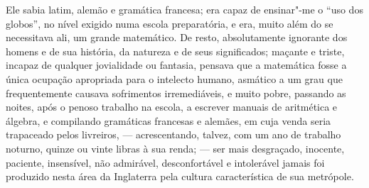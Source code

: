 Ele sabia latim, alemão e gramática francesa; era capaz de ensinar"-me o
``uso dos globos'', no nível exigido numa escola preparatória, e era,
muito além do se necessitava ali, um grande matemático. De resto,
absolutamente ignorante dos homens e de sua história, da natureza e de
seus significados; maçante e triste, incapaz de qualquer jovialidade ou
fantasia, pensava que a matemática fosse a única ocupação apropriada
para o intelecto humano, asmático a um grau que frequentemente causava
sofrimentos irremediáveis, e muito pobre, passando as noites, após o
penoso trabalho na escola, a escrever manuais de aritmética e álgebra, e
compilando gramáticas francesas e alemães, em cuja venda seria
trapaceado pelos livreiros, --- acrescentando, talvez, com um ano de
trabalho noturno, quinze ou vinte libras à sua renda; --- ser mais
desgraçado, inocente, paciente, insensível, não admirável,
desconfortável e intolerável jamais foi produzido nesta área da
Inglaterra pela cultura característica de sua metrópole.

